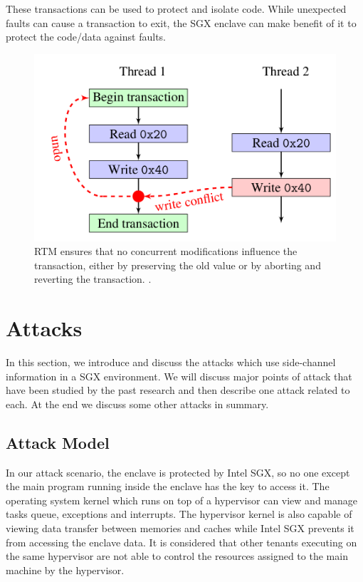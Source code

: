 These transactions can be used to protect and isolate code. While unexpected faults can cause a transaction to exit, the SGX enclave can make benefit of it to protect the code/data against faults.

\begin{figure}
	\includegraphics[scale=0.2]{images/rtm}
	\caption{RTM ensures that no concurrent modifications influence the transaction, either by preserving the old value or by aborting and reverting the transaction. \cite{cloak}.}
	\label{fig:rtm}
\end{figure}

\section{Attacks}
In this section, we introduce and discuss the attacks which use side-channel information in a SGX environment. We will discuss major points of attack that have been studied by the past research and then describe one attack related to each. At the end we discuss some other attacks in summary.

\subsection{Attack Model}
In our attack scenario, the enclave is protected by Intel SGX, so no one except the main program running inside the enclave has the key to access it. The operating system kernel which runs on top of a hypervisor can view and manage tasks queue, exceptions and interrupts. The hypervisor kernel is also capable of viewing data transfer between memories and caches while Intel SGX prevents it from accessing the enclave data. It is considered that other tenants executing on the same hypervisor are not able to control the resources assigned to the main machine by the hypervisor.

